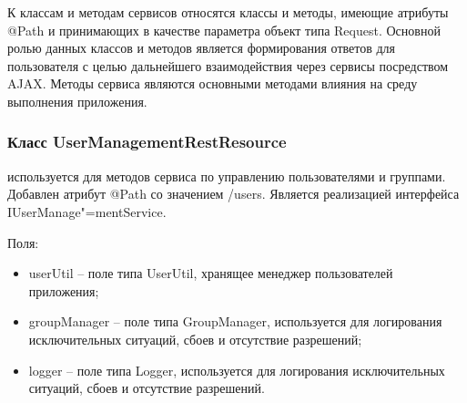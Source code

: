 К классам и методам сервисов относятся классы и методы, имеющие атрибуты @Path и принимающих в качестве параметра объект типа Request. Основной ролью данных классов и методов является формирования ответов для пользователя с целью дальнейшего взаимодействия через сервисы посредством AJAX. Методы сервиса являются основными методами влияния на среду выполнения приложения.

\subsubsection{Класс UserManagementRestResource }
\label{sub:arch_and_mod:application_server_layer:user-management-rest-resource}

используется для методов сервиса по управлению пользователями и группами. Добавлен атрибут @Path со значением /users. Является реализацией интерфейса IUserManage"=mentService.

Поля:
\begin{itemize}
  \item userUtil – поле типа UserUtil, хранящее менеджер пользователей приложения;
  \item groupManager – поле типа GroupManager, используется для логирования исключительных ситуаций, сбоев и отсутствие разрешений;
  \item logger – поле типа Logger, используется для логирования исключительных ситуаций, сбоев и отсутствие разрешений.
\end{itemize}

